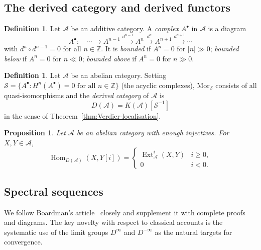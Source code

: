 \documentclass[12pt,a4paper]{article}
\newtheorem{proposition}[theorem]{Proposition}
\theoremstyle{definition}
\newtheorem{definition}[theorem]{Definition}
\newcommand{\Hom}{\operatorname{Hom}}
\newcommand{\Ext}{\operatorname{Ext}}
\newcommand{\Z}{\mathbb{Z}}
\begin{document}
\subsection{The derived category and derived functors}

\begin{definition}\label{def:complex}
Let $\mathcal{A}$ be an additive category.  A \emph{complex} $A^\bullet$ in
$\mathcal{A}$ is a diagram
\[
  A^\bullet:\quad\cdots\longrightarrow A^{n-1}\xrightarrow{d^{n-1}} A^n
  \xrightarrow{d^n} A^{n+1}\xrightarrow{d^{n+1}}\cdots
\]
with $d^n\circ d^{n-1}=0$ for all $n\in\Z$.  It is \emph{bounded} if
$A^n=0$ for $|n|\gg 0$; \emph{bounded below} if $A^n=0$ for $n\ll 0$;
\emph{bounded above} if $A^n=0$ for $n\gg 0$.
\end{definition}

\begin{definition}\label{def:derived}
Let $\mathcal{A}$ be an abelian category.  Setting
$\mathcal{S}=\{A^\bullet: H^n(A^\bullet)=0\text{ for all }n\in\Z\}$
(the acyclic complexes), $\mathrm{Mor}_\mathcal{S}$ consists of all quasi-isomorphisms
and the \emph{derived category} of $\mathcal{A}$ is
\[
  D(\mathcal{A}) = K(\mathcal{A})[\mathcal{S}^{-1}]
\]
in the sense of Theorem~\ref{thm:Verdier-localisation}.
\end{definition}

\begin{proposition}\label{prop:Ext-Hom}
Let $\mathcal{A}$ be an abelian category with enough injectives.  For $X,Y\in\mathcal{A}$,
\[
  \Hom_{D(\mathcal{A})}(X,Y[i]) =
  \begin{cases}
    \Ext^i_\mathcal{A}(X,Y) & i\geq 0,\\
    0 & i<0.
  \end{cases}
\]
\end{proposition}

\subsection{Spectral sequences}
\label{subsec:spectral-sequences}

We follow Boardman's article~\cite{Boa99} closely and supplement it with complete
proofs and diagrams.  The key novelty with respect to classical accounts is the
systematic use of the limit groups $D^\infty$ and $D^{-\infty}$ as the natural
targets for convergence.
\end{document}
